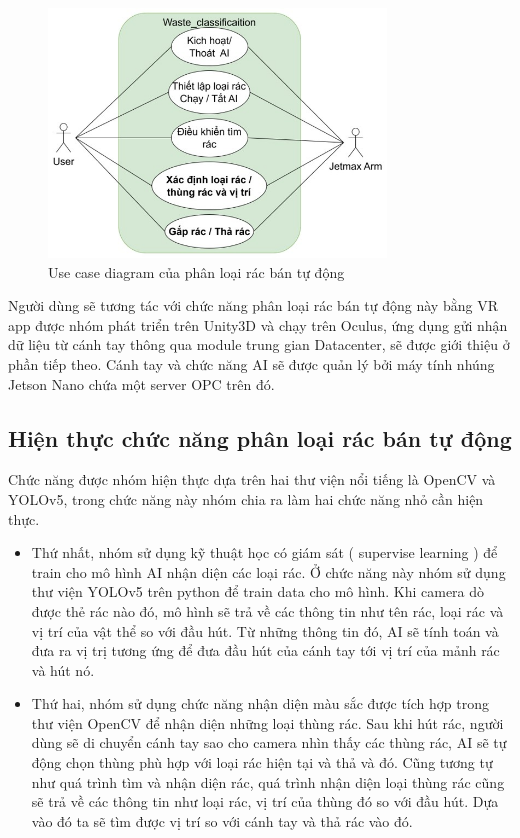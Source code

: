     \begin{figure}[!h]
        \centering
        \includegraphics[width=0.8\textwidth]{Images/Implementation/AI/waste_usecase.jpg}
        \caption{Use case diagram của phân loại rác bán tự động}
    \end{figure}



Người dùng sẽ tương tác với chức năng phân loại rác bán tự động này bằng VR app được nhóm phát triển trên Unity3D và chạy trên Oculus, ứng dụng gửi nhận dữ liệu từ cánh tay thông qua module trung gian Datacenter, sẽ được giới thiệu ở phần tiếp theo. Cánh tay và chức năng AI sẽ được quản lý bởi máy tính nhúng Jetson Nano chứa một server OPC trên đó.
\subsection{Hiện thực chức năng phân loại rác bán tự động}
Chức năng được nhóm hiện thực dựa trên hai thư viện nổi tiếng là OpenCV và YOLOv5, trong chức năng này nhóm chia ra làm hai chức năng nhỏ cần hiện thực.

\newpage

\begin{itemize}
    \item Thứ nhất, nhóm sử dụng kỹ thuật học có giám sát ( supervise learning ) để train cho mô hình AI nhận diện các loại rác. Ở chức năng này nhóm sử dụng thư viện YOLOv5 trên python để train data cho mô hình. Khi camera dò được thẻ rác nào đó, mô hình sẽ trả về các thông tin như tên rác, loại rác và vị trí của vật thể so với đầu hút. Từ những thông tin đó, AI sẽ tính toán và đưa ra vị trị tương ứng để đưa đầu hút của cánh tay tới vị trí của mảnh rác và hút nó.
    \item Thứ hai, nhóm sử dụng chức năng nhận diện màu sắc được tích hợp trong thư viện OpenCV để nhận diện những loại thùng rác. Sau khi hút rác, người dùng sẽ di chuyển cánh tay sao cho camera nhìn thấy các thùng rác, AI sẽ tự động chọn thùng phù hợp với loại rác hiện tại và thả và đó. Cũng tương tự như quá trình tìm và nhận diện rác, quá trình nhận diện loại thùng rác cũng sẽ trả về các thông tin như loại rác, vị trí của thùng đó so với đầu hút. Dựa vào đó ta sẽ tìm được vị trí so với cánh tay và thả rác vào đó.
\end{itemize}

